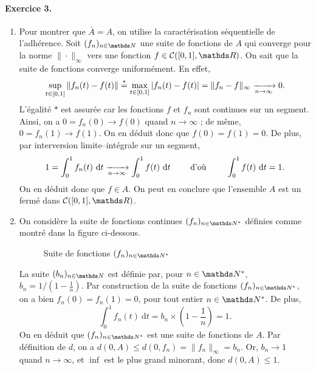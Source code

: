 \documentclass[a4paper]{article}
\begin{document}
	\paragraph{Exercice 3.}
	\begin{enumerate}
		\item Pour montrer que $\bar{A} = A$, on utilise la caractérisation séquentielle de l'adhérence.
			Soit $(f_n)_{n\in\N}$ une suite de fonctions de $A$ qui converge pour la norme $\|\cdot\|_\infty$ vers une fonction $f \in \mathcal{C}([0,1],\R)$.
			On sait que la suite de fonctions converge uniformément. En effet, \[
				\sup_{t \in [0,1]} \|f_n(t) - f(t)\| \mathrel{\overset*=} \max_{t \in [0,1]} |f_n(t) - f(t)| = \|f_n - f\|_\infty \xrightarrow[n\to \infty]{} 0.
			\]L'égalité $*$ est assurée car les fonctions $f$ et $f_n$ sont continues sur un segment.
			Ainsi, on a $0 = f_n(0) \to f(0)$ quand $n \to \infty$ ; de même, $0 = f_n(1) \to f(1)$.
			On en déduit donc que $f(0) = f(1) = 0$.
			De plus, par interversion limite--intégrale sur un segment, \[
				1 = \int_{0}^{1} f_n(t)~\mathrm{d}t \xrightarrow[n\to \infty]{} \int_{0}^{1} f(t)~\mathrm{d}t
				\quad\quad \text{ d'où } \quad\quad \int_{0}^{1} f(t)~\mathrm{d}t = 1
			.\]
			On en déduit donc que $f \in A$.
			On peut en conclure que l'ensemble $A$ est un fermé dans $\mathcal{C}([0,1], \R)$.
		\item On considère la suite de fonctions continues $(f_n)_{n \in \N^*}$ définies comme montré dans la figure ci-dessous.
			\begin{figure}[H]
				\centering
				\caption{Suite de fonctions $(f_n)_{n \in \N^*}$}
			\end{figure}
			La suite $(b_n)_{n \in \N}$ est définie par, pour $n \in \N^*$, $b_n = 1 / (1 - \frac{1}{n})$.
			Par construction de la suite de fonctions $(f_n)_{n \in \N^*}$, on a bien $f_n(0) = f_n(1) = 0$, pour tout entier $n \in \N^*$.
			De plus, 
			\[
				\int_{0}^{1} f_n(t)~\mathrm{d}t = b_n \times \left( 1 - \frac{1}{n} \right) = 1.
			\]
			On en déduit que $(f_n)_{n \in \N^*}$ est une suite de fonctions de $A$.
			Par définition de $d$, on a $d(0, A) \le d(0, f_n) = \|f_n\|_\infty = b_n$.
			Or, $b_n \to 1$ quand $n \to \infty$, et $\inf$ est le plus grand minorant, donc $d(0, A) \le 1$.
	\end{enumerate}
\end{document}
